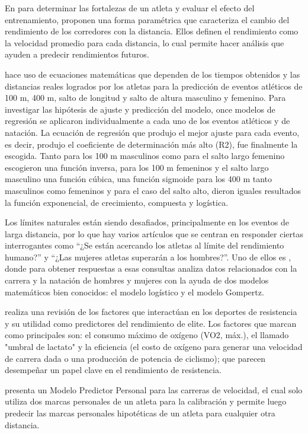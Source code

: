 En \cite{grubb1998models} para determinar las fortalezas de un atleta y evaluar el efecto del entrenamiento, proponen una forma paramétrica que caracteriza el cambio del rendimiento de los corredores con la distancia. Ellos definen el rendimiento como la velocidad promedio para cada distancia, lo cual permite hacer análisis que ayuden a predecir rendimientos futuros.

\cite{heazlewood2006prediction} hace uso de ecuaciones matemáticas que dependen de los tiempos obtenidos y las distancias reales logrados por los atletas para la predicción de eventos atléticos de 100 m, 400 m, salto de longitud y salto de altura masculino y femenino. Para investigar las hipótesis de ajuste y predicción del modelo, once modelos de regresión se aplicaron individualmente a cada uno de los eventos atléticos y de natación. La ecuación de regresión que produjo el mejor ajuste para cada evento, es decir, produjo el coeficiente de determinación más alto (R2), fue finalmente la escogida. Tanto para los 100 m masculinos como para el salto largo femenino escogieron una función inversa, para los 100 m femeninos y el salto largo masculino una función cúbica, una función sigmoide para los 400 m tanto masculinos como femeninos y para el caso del salto alto, dieron iguales resultados la función exponencial, de crecimiento, compuesta y logística.  

Los límites naturales están siendo desafiados, principalmente en los eventos de larga distancia, por lo que hay varios artículos que se centran en responder ciertas interrogantes como “¿Se están acercando los atletas al límite del rendimiento humano?” y “¿Las mujeres atletas superarán a los hombres?”. Uno de ellos es \cite{kumarforecasting}, donde para obtener respuestas a esas consultas analiza datos relacionados con la carrera y la natación de hombres y mujeres con la ayuda de dos modelos matemáticos bien conocidos: el modelo logístico y el modelo Gompertz.

\cite{joyner2008endurance} realiza una revisión de los factores que interactúan en los deportes de resistencia y su utilidad como predictores del rendimiento de elite. Los factores que marcan como principales son: el consumo máximo de oxígeno (VO2, máx.), el llamado "umbral de lactato" y la eficiencia (el costo de oxígeno para generar una velocidad de carrera dada o una producción de potencia de ciclismo); que parecen desempeñar un papel clave en el rendimiento de resistencia.

\cite{westera2011phenomenology} presenta un Modelo Predictor Personal para las carreras de velocidad, el cual solo utiliza dos marcas personales de un atleta para la calibración y permite luego predecir las marcas personales hipotéticas de un atleta para cualquier otra distancia.

